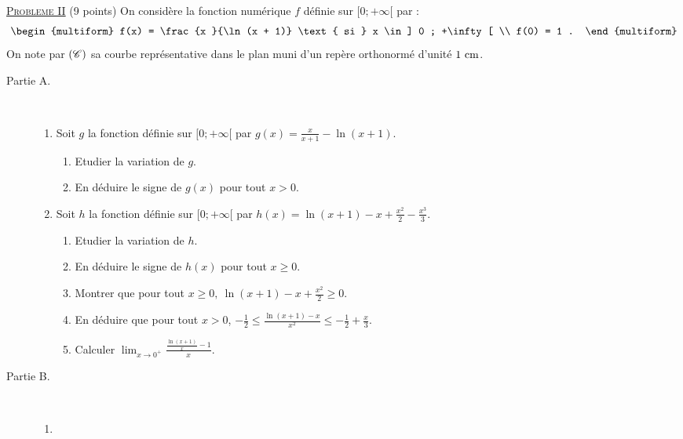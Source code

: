 \noindent \underline{\textsc{Probleme II}} (9 points) \newline
On consid\`ere la fonction num\'erique $f$ d\'efinie sur $[ 0 ; +\infty[$ par : 
	\[
		\begin{multiform}
			f(x) = \frac{x }{\ln (x + 1)} \text{ si } x \in ] 0 ; +\infty[	\\
			f(0) = 1	.
		\end{multiform}
	\]
On note par $(\mathscr{C})$ sa courbe repr\'esentative dans le plan muni d'un rep\`ere orthonorm\'e \Oij{} d'unit\'e $1~\mathrm{cm}$.
\begin{description}
	\item[Partie A.]~\newline
		\begin{enumerate}
			\item Soit $g$ la fonction d\'efinie sur $[ 0 ; +\infty [$ par $g(x) = \frac{x}{x+1} - \ln (x + 1)$.
				\begin{enumerate}
					\item Etudier la variation de $g$.
					\item En d\'eduire le signe de $g(x)$ pour tout $x > 0$.
				\end{enumerate}
			\item Soit $h$ la fonction d\'efinie sur $[ 0 ; +\infty[$ par $h(x) = \ln (x+1) - x + \frac{x^2}{2} - \frac{x^3}{3}$.
				\begin{enumerate}
					\item Etudier la variation de $h$.
					\item En d\'eduire le signe de $h(x)$ pour tout $x \geq 0$.
					\item Montrer que pour tout $\displaystyle{x \geq 0,\ \ln (x+1) - x + \frac{x^2}{2} \geq 0}$.
					\item En d\'eduire que pour tout $x > 0$, 
						$
							\displaystyle{
								-\frac{1}{2} \leq \frac{\ln (x+1) - x}{x^2} \leq -\frac{1}{2} + \frac{x}{3}	.
							}
						$
					\item Calculer 
						$
							\displaystyle{
								\lim_{x\rightarrow 0^+}
									\frac{\frac{\ln (x+1)}{x} - 1}{x}
							}.
						$
				\end{enumerate}
		\end{enumerate}
	\item[Partie B.]~\newline
		\begin{enumerate}
			\item %

\end{enumerate}
\end{description}
